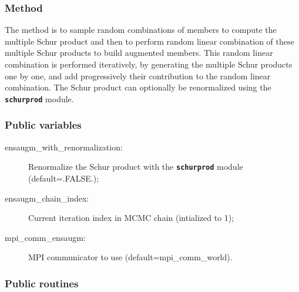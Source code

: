 \documentclass[11pt]{article}
\begin{document}
\subsubsection*{Method}

The method is to sample random combinations of members
to compute the multiple Schur product
and then to perform random linear combination
of these multiple Schur products to build augmented members.
This random linear combination is performed iteratively,
by generating the multiple Schur products one by one,
and add progressively their contribution to the random linear combination.
The Schur product can optionally be renormalized using the {\bf\tt schurprod} module.

\subsubsection*{Public variables}

\begin{description}
\item[ensaugm\_with\_renormalization:] Renormalize the Schur product
               with the {\bf\tt schurprod} module (default=.FALSE.);
\item[ensaugm\_chain\_index:] Current iteration index in MCMC chain (intialized to 1);
\item[mpi\_comm\_ensaugm:] MPI communicator to use (default=mpi\_comm\_world).
\end{description}

\subsubsection*{Public routines}
\end{document}
